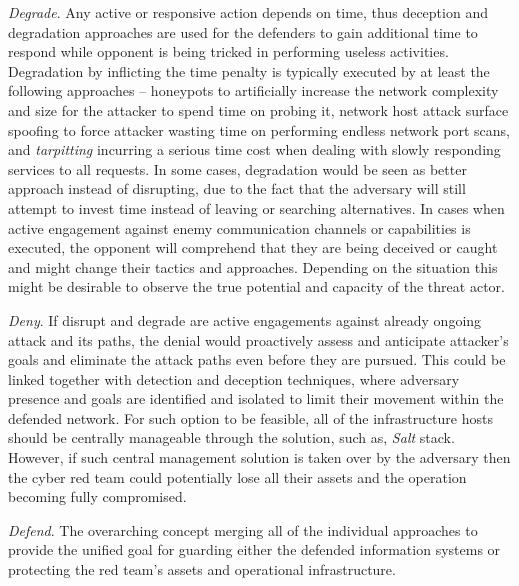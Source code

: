 \textit{Degrade}. Any active or responsive action depends on time, thus deception and degradation approaches are used for the defenders to gain additional time to respond while opponent is being tricked in performing useless activities. Degradation by inflicting the time penalty is typically executed by at least the following approaches -- honeypots to artificially increase the network complexity and size for the attacker to spend time on probing it, network host attack surface spoofing to force attacker wasting time on performing endless network port scans, and \textit{tarpitting} incurring a serious time cost when dealing with slowly responding services to all requests. In some cases, degradation would be seen as better approach instead of disrupting, due to the fact that the adversary will still attempt to invest time instead of leaving or searching alternatives.
In cases when active engagement against enemy communication channels or capabilities is executed, the opponent will comprehend that they are being deceived or caught and might change their tactics and approaches. Depending on the situation this might be desirable to observe the true potential and capacity of the threat actor.

\textit{Deny}. If disrupt and degrade are active engagements against already ongoing attack and its paths, the denial would proactively assess and anticipate attacker's goals and eliminate the attack paths even before they are pursued. This could be linked together with detection and deception techniques, where adversary presence and goals are identified and isolated to limit their movement within the defended network. For such option to be feasible, all of the infrastructure hosts should be centrally manageable through the solution, such as, \textit{Salt} stack. However, if such central management solution is taken over by the adversary then the cyber red team could potentially lose all their assets and the operation becoming fully compromised.

\textit{Defend}. The overarching concept merging all of the individual approaches to provide the unified goal for guarding either the defended information systems or protecting the red team's assets and operational infrastructure.


